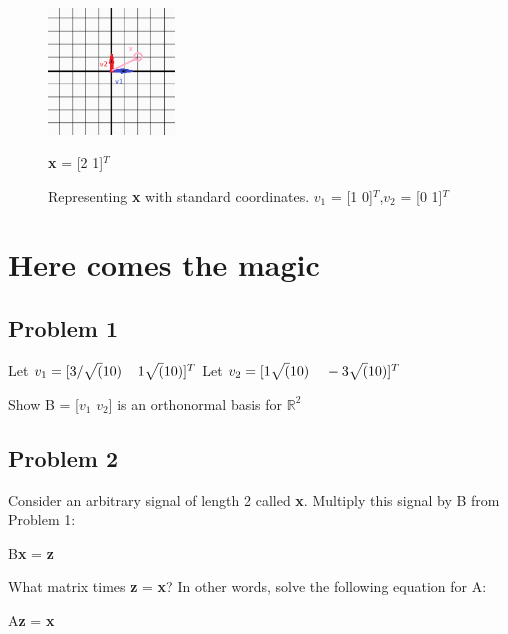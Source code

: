 \documentclass[11pt]{article}
\begin{document}
\vspace{20mm}
\begin{figure}[h]

\centering
\includegraphics[width=0.3\textwidth]{Standard Basis.png}
\caption {Representing \textbf{x} with standard coordinates. $v_1$ = [1 0]$^T$,$v_2$ = [0 1]$^T$} \textbf{x} = [2 1]$^T$
\end{figure}





\newpage
\section{Here comes the magic}
\subsection{Problem 1}
Let $v_1 = [3/\sqrt(10) \hspace{4mm}1\sqrt(10)]^T
$\newline
Let $v_2 = [1\sqrt(10) \hspace{4mm}-3\sqrt(10)]^T
$

\vspace{4mm}
Show B  = [$v_1$ $v_2$] is an orthonormal basis for $\mathbb{R}^2$

\subsection{Problem 2}
Consider an arbitrary signal of length 2 called \textbf{x}. Multiply this signal by B from Problem 1:

\begin{center}

B\textbf{x} = \textbf{z}

\end{center}

\vspace{10mm}
What matrix times \textbf{z} = \textbf{x}? In other words, solve the following equation for A:

\begin{center}
A\textbf{z} = \textbf{x}

\end{center}
\end{document}
